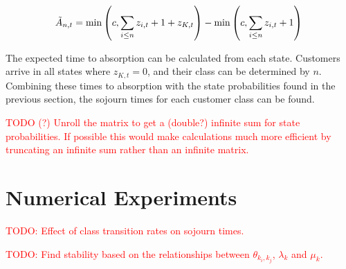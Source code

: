 \documentclass{article}
\begin{document}
\begin{equation}\label{eqn:inservice_adapt_tilde}
\tilde{A}_{n,t} =
\min\left(c, \sum_{i \leq n} z_{i,t} + 1 + z_{K,t}\right) - \min\left(c, \sum_{i \leq n} z_{i,t} + 1\right) \\
\end{equation}


The expected time to absorption can be calculated from each state.
Customers arrive in all states where $z_{K,t} = 0$, and their class can be
determined by $n$. Combining these times to absorption with the state
probabilities found in the previous section, the sojourn times for each customer
class can be found.

\textcolor{red}{TODO (?) Unroll the matrix to get a (double?) infinite sum for state probabilities. If possible this would make calculations much more efficient by truncating an infinite sum rather than an infinite matrix.}

\section{Numerical Experiments}

\textcolor{red}{TODO: Effect of class transition rates on sojourn times.}

\textcolor{red}{TODO: Find stability based on the relationships between $\theta_{k_i,k_j}$, $\lambda_k$ and $\mu_k$.}



\end{document}
